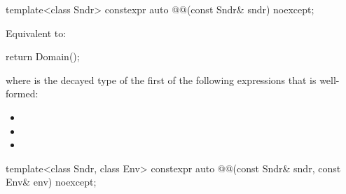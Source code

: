 \begin{itemdecl}
template<class Sndr>
  constexpr auto @@(const Sndr& sndr) noexcept;
\end{itemdecl}

\begin{itemdescr}
\pnum
\effects
Equivalent to:
\begin{codeblock}
return Domain();
\end{codeblock}
where  is
the decayed type of the first of the following expressions that is well-formed:
\begin{itemize}
\item {}
\item {}
\item {}
\end{itemize}
\end{itemdescr}

\begin{itemdecl}
template<class Sndr, class Env>
  constexpr auto @@(const Sndr& sndr, const Env& env) noexcept;
\end{itemdecl}

